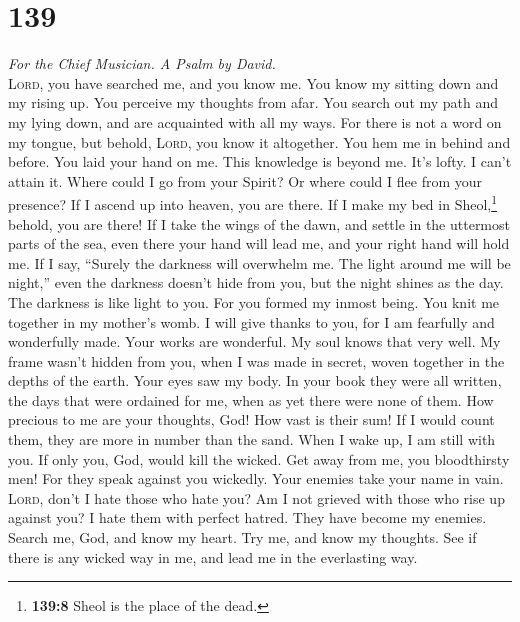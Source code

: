 \hypertarget{section-138}{%
\section{139}\label{section-138}}

\emph{For the Chief Musician. A Psalm by David.}\\
 \textsc{Lord}, you have searched me, and you know me.
 You know my sitting down and my rising up. You perceive
my thoughts from afar.  You search out my path and my
lying down, and are acquainted with all my ways.  For
there is not a word on my tongue, but behold, \textsc{Lord}, you know it
altogether.  You hem me in behind and before. You laid
your hand on me.  This knowledge is beyond me. It's lofty.
I can't attain it.  Where could I go from your Spirit? Or
where could I flee from your presence?  If I ascend up
into heaven, you are there. If I make my bed in Sheol,\footnote{\textbf{139:8}
  Sheol is the place of the dead.} behold, you are there! 
If I take the wings of the dawn, and settle in the uttermost parts of
the sea,  even there your hand will lead me, and your
right hand will hold me.  If I say, ``Surely the darkness
will overwhelm me. The light around me will be night,'' 
even the darkness doesn't hide from you, but the night shines as the
day. The darkness is like light to you.  For you formed
my inmost being. You knit me together in my mother's womb.
 I will give thanks to you, for I am fearfully and
wonderfully made. Your works are wonderful. My soul knows that very
well.  My frame wasn't hidden from you, when I was made
in secret, woven together in the depths of the earth. 
Your eyes saw my body. In your book they were all written, the days that
were ordained for me, when as yet there were none of them.
 How precious to me are your thoughts, God! How vast is
their sum!  If I would count them, they are more in
number than the sand. When I wake up, I am still with you.
 If only you, God, would kill the wicked. Get away from
me, you bloodthirsty men!  For they speak against you
wickedly. Your enemies take your name in vain. 
\textsc{Lord}, don't I hate those who hate you? Am I not grieved with
those who rise up against you?  I hate them with perfect
hatred. They have become my enemies.  Search me, God, and
know my heart. Try me, and know my thoughts.  See if
there is any wicked way in me, and lead me in the everlasting way.

